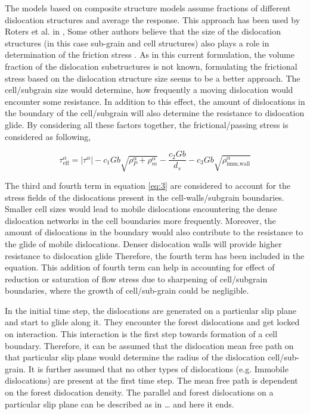 \documentclass[a4paper,11pt]{article}
\begin{document}
The models based on composite structure models assume fractions of different dislocation structures and average the response. This approach has been used by Roters et al. in \cite{Roters2000}, \cite{Ma2004}
Some other authors believe that the size of the dislocation structures (in this case sub-grain and cell structures) also plays a role in determination of the friction stress \cite{Nes1997}. 
As in this current formulation, the volume fraction of the dislocation substructures is not known, formulating the frictional stress based on the dislocation structure size seems to be a better approach.
The cell/subgrain size would determine, how frequently a moving dislocation would encounter some resistance. In addition to this effect, the amount of dislocations in the boundary of the cell/subgrain will also determine 
the resistance to dislocation glide. By considering all these factors together, the frictional/passing stress is considered as following,

\begin{equation} 
\tau_{\text{eff}}^\alpha = \left|\tau^\alpha\right| - c_1 G b \sqrt{\rho_P^\alpha + \rho_m^\alpha} - \frac{c_2 G b}{d_s} - c_3 G b \sqrt{\rho_{\text{imm,wall}}^\alpha} \label{eq:3}
\end{equation}

The third and fourth term in equation \eqref{eq:3} are considered to account for the stress fields of the dislocations present in the cell-walls/subgrain boundaries. 
Smaller cell sizes would lead to mobile dislocations encountering the dense dislocation networks in the cell boundaries more frequently. 
Moreover, the amount of dislocations in the boundary would also contribute to the resistance to the glide of mobile dislocations. Denser dislocation walls will provide higher resistance to dislocation glide
Therefore, the fourth term has been included in the equation. 
This addition of fourth term can help in accounting for effect of reduction or saturation of flow stress due to sharpening of cell/subgrain boundaries, where the growth of cell/sub-grain could be negligible. 

In the initial time step, the dislocations are generated on a particular slip plane and start to glide along it. 
They encounter the forest dislocations and get locked on interaction. 
This interaction is the first step towards formation of a cell boundary. 
Therefore, it can be assumed that the dislocation mean free path on that particular slip plane would determine the radius of the dislocation cell/sub-grain. 
It is further assumed that no other types of dislocations (e.g. Immobile dislocations) are present at the first time step. 
The mean free path is dependent on the forest dislocation density. The parallel and forest dislocations on a particular slip plane can be described as in \cite{Roters2011}
\ldots{} and here it ends.


\end{document}
